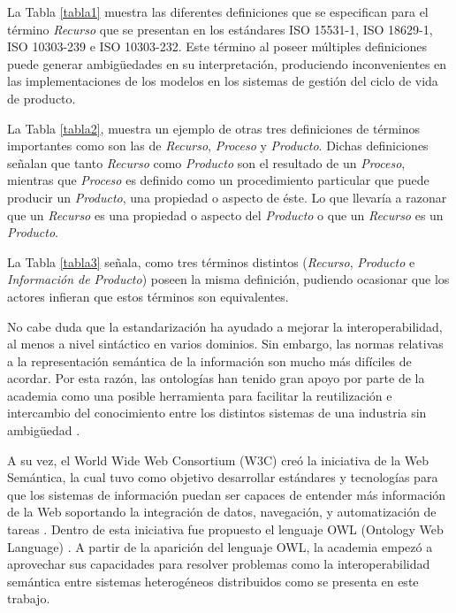 \documentclass[journal]{IEEEtran}
\begin{document}
La Tabla \ref{tabla1} muestra las diferentes definiciones que se especifican para el t\'ermino \emph{Recurso} que se presentan en los est\'andares ISO 15531-1, ISO 18629-1, ISO 10303-239 e ISO 10303-232. Este t\'ermino al poseer m\'ultiples definiciones puede generar ambig\"uedades en su interpretaci\'on, produciendo inconvenientes en las implementaciones de los modelos en los sistemas de gesti\'on del ciclo de vida de producto. 

La Tabla \ref{tabla2}, muestra un ejemplo de otras tres definiciones de t\'erminos importantes como son las de \emph{Recurso}, \emph{Proceso} y \emph{Producto}. Dichas definiciones se\~nalan que tanto \emph{Recurso} como \emph{Producto} son el resultado de un \emph{Proceso}, mientras que \emph{Proceso} es definido como un procedimiento particular que puede producir un \emph{Producto}, una propiedad o aspecto de \'este. Lo que llevar\'ia a razonar que un \emph{Recurso} es una propiedad o aspecto del \emph{Producto} o que un \emph{Recurso} es un \emph{Producto}. 

La Tabla \ref{tabla3} se\~nala, como tres t\'erminos distintos (\emph{Recurso}, \emph{Producto} e \emph{Informaci\'on de Producto}) poseen la misma definici\'on, pudiendo ocasionar que los actores infieran que estos t\'erminos son equivalentes.

No cabe duda que la estandarizaci\'on ha ayudado a mejorar la interoperabilidad, al menos a nivel sint\'actico en varios dominios. Sin embargo, las normas relativas a la representaci\'on sem\'antica de la informaci\'on son mucho m\'as dif\'iciles de acordar. Por esta raz\'on, las ontolog\'ias han tenido gran apoyo por parte de la academia como una posible herramienta para facilitar la reutilizaci\'on e intercambio del conocimiento entre los distintos sistemas de una industria sin ambig\"{u}edad \cite{CuongPhamCongandDurupt2015KnowledgeManagement}.

A su vez, el World Wide Web Consortium (W3C) cre\'o la iniciativa de la Web Sem\'antica, la cual tuvo como objetivo desarrollar est\'andares y tecnolog\'ias para que los sistemas de informaci\'on puedan ser capaces de entender m\'as informaci\'on de la Web soportando la integraci\'on de datos, navegaci\'on, y automatizaci\'on de tareas \cite{koivunen2001w3c}. Dentro de esta iniciativa fue propuesto el lenguaje OWL (Ontology Web Language) \cite{mcguinness2004owl}. A partir de la aparici\'on del lenguaje OWL, la academia empez\'o a aprovechar sus capacidades para resolver problemas como la interoperabilidad sem\'antica entre sistemas heterog\'eneos distribuidos como se presenta en este trabajo.
\end{document}
